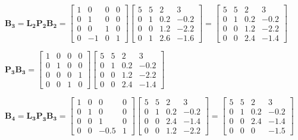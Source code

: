 \documentclass[english,onecolumn]{IEEEtran}
\begin{document}
\begin{enumerate}
\begin{enumerate}
	  $
		\mathbf{B_3} = \mathbf{L_2P_2B_2}= 
		\begin{bmatrix}
			1 & 0 & 0 & 0\\
			0 & 1  & 0  & 0\\
			0 & 0 & 1& 0\\
			0 & -1 & 0 & 1
		\end{bmatrix}
		\begin{bmatrix}
		5 & 5 & 2 & 3\\
		0 & 1 & 0.2 & -0.2\\
		0 & 0 & 1.2 & -2.2\\
		0 & 1 & 2.6 & -1.6
		\end{bmatrix}=
		\begin{bmatrix}
			5 & 5 & 2 & 3\\
			0 & 1 & 0.2 & -0.2\\
			0 & 0 & 1.2 & -2.2\\
			0 & 0 & 2.4 & -1.4
		\end{bmatrix}	
		$
		  
		  $\mathbf{P_3}\mathbf{B_3} = 
		  	\begin{bmatrix}
		  	1 & 0 & 0 & 0\\
		  	0 & 1  & 0  & 0\\
		  	0 & 0 & 0& 1\\
		  	0 & 0 & 1& 0
		  \end{bmatrix}
		  \begin{bmatrix}
			5 & 5 & 2 & 3\\
			0 & 1 & 0.2 & -0.2\\
			0 & 0 & 1.2 & -2.2\\
			0 & 0 & 2.4 & -1.4
		  \end{bmatrix}
		  $
		  
		  $
		  \mathbf{B_4} = \mathbf{L_3P_3B_3}= 
		  \begin{bmatrix}
		  	1 & 0 & 0 & 0\\
		  	0 & 1  & 0  & 0\\
		  	0 & 0 & 1& 0\\
		  	0 & 0 & -0.5 & 1
		  \end{bmatrix}
		  \begin{bmatrix}
		  	5 & 5 & 2 & 3\\
		  	0 & 1 & 0.2 & -0.2\\
		  	0 & 0 & 2.4 & -1.4\\
		  	0 & 0 & 1.2 & -2.2
		  \end{bmatrix}	=
	  	\begin{bmatrix}
		  5 & 5 & 2 & 3\\
		  0 & 1 & 0.2 & -0.2\\
		  0 & 0 & 2.4 & -1.4\\
		  0 & 0 & 0 & -1.5
	  	\end{bmatrix}
		  $
		  

\end{enumerate}
\end{enumerate}
\end{document}
